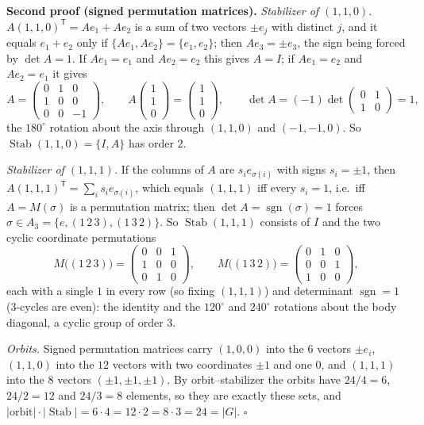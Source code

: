 \documentclass[11pt]{report}
\newcommand{\sgn}{\operatorname{sgn}}
\renewenvironment{proof}[1][Proof]{\noindent\textbf{#1.} }{\hfill$\square$\par\vspace{5pt}}
\begin{document}
\begin{proof}[Second proof (signed permutation matrices)]
\emph{Stabilizer of $(1,1,0)$.} $A(1,1,0)^{\mathsf{T}} = Ae_1 + Ae_2$ is a sum of two vectors $\pm e_j$ with distinct $j$, and it equals $e_1 + e_2$ only if $\{Ae_1, Ae_2\} = \{e_1, e_2\}$; then $Ae_3 = \pm e_3$, the sign being forced by $\det A = 1$. If $Ae_1 = e_1$ and $Ae_2 = e_2$ this gives $A = I$; if $Ae_1 = e_2$ and $Ae_2 = e_1$ it gives
\[ A = \begin{pmatrix} 0 & 1 & 0 \\ 1 & 0 & 0 \\ 0 & 0 & -1 \end{pmatrix}, \qquad A\begin{pmatrix} 1 \\ 1 \\ 0 \end{pmatrix} = \begin{pmatrix} 1 \\ 1 \\ 0 \end{pmatrix}, \qquad \det A = (-1) \det\begin{pmatrix} 0 & 1 \\ 1 & 0 \end{pmatrix} = 1, \]
the $180^\circ$ rotation about the axis through $(1,1,0)$ and $(-1,-1,0)$. So $\operatorname{Stab}(1,1,0) = \{I, A\}$ has order $2$.

\emph{Stabilizer of $(1,1,1)$.} If the columns of $A$ are $s_i e_{\sigma(i)}$ with signs $s_i = \pm 1$, then $A(1,1,1)^{\mathsf{T}} = \sum_i s_i e_{\sigma(i)}$, which equals $(1,1,1)$ iff every $s_i = 1$, i.e.\ iff $A = M(\sigma)$ is a permutation matrix; then $\det A = \sgn(\sigma) = 1$ forces $\sigma \in A_3 = \{e, (1\,2\,3), (1\,3\,2)\}$. So $\operatorname{Stab}(1,1,1)$ consists of $I$ and the two cyclic coordinate permutations
\[ M\big((1\,2\,3)\big) = \begin{pmatrix} 0 & 0 & 1 \\ 1 & 0 & 0 \\ 0 & 1 & 0 \end{pmatrix}, \qquad M\big((1\,3\,2)\big) = \begin{pmatrix} 0 & 1 & 0 \\ 0 & 0 & 1 \\ 1 & 0 & 0 \end{pmatrix}, \]
each with a single $1$ in every row (so fixing $(1,1,1)$) and determinant $\sgn = 1$ ($3$-cycles are even): the identity and the $120^\circ$ and $240^\circ$ rotations about the body diagonal, a cyclic group of order $3$.

\emph{Orbits.} Signed permutation matrices carry $(1,0,0)$ into the $6$ vectors $\pm e_i$, $(1,1,0)$ into the $12$ vectors with two coordinates $\pm 1$ and one $0$, and $(1,1,1)$ into the $8$ vectors $(\pm 1, \pm 1, \pm 1)$. By orbit--stabilizer the orbits have $24/4 = 6$, $24/2 = 12$ and $24/3 = 8$ elements, so they are exactly these sets, and $|\text{orbit}| \cdot |\operatorname{Stab}| = 6 \cdot 4 = 12 \cdot 2 = 8 \cdot 3 = 24 = |G|$.
\end{proof}
\end{document}
